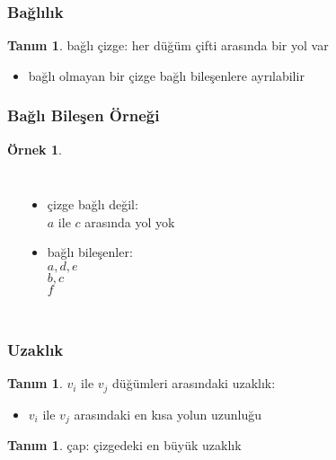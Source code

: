\documentclass[dvipsnames]{beamer}
\theoremstyle{definition}
\newtheorem{tanim}[theorem]{Tanım}
\theoremstyle{example}
\newtheorem{ornek}[theorem]{Örnek}
\theoremstyle{plain}
\begin{document}
\begin{frame}
  \frametitle{Bağlılık}

  \begin{tanim}
    \alert{bağlı} çizge: her düğüm çifti arasında bir yol var
  \end{tanim}

  \pause
  \begin{itemize}
    \item bağlı olmayan bir çizge bağlı bileşenlere ayrılabilir
  \end{itemize}
\end{frame}

\begin{frame}
  \frametitle{Bağlı Bileşen Örneği}

  \begin{ornek}
    \begin{columns}
      \begin{center}
      \end{center}

      \begin{itemize}
        \item çizge bağlı değil:\\
          $a$ ile $c$ arasında yol yok
        \item bağlı bileşenler:\\
          $a,d,e$\\
          $b,c$\\
          $f$
      \end{itemize}
    \end{columns}
  \end{ornek}
\end{frame}

\begin{frame}
  \frametitle{Uzaklık}

  \begin{tanim}
    $v_i$ ile $v_j$ düğümleri arasındaki \alert{uzaklık}:
    \begin{itemize}
      \item $v_i$ ile $v_j$ arasındaki en kısa yolun uzunluğu
    \end{itemize}
  \end{tanim}

  \pause
  \begin{tanim}
    \alert{çap}: çizgedeki en büyük uzaklık
  \end{tanim}
\end{frame}
\end{document}
